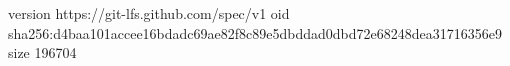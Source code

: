 version https://git-lfs.github.com/spec/v1
oid sha256:d4baa101accee16bdadc69ae82f8c89e5dbddad0dbd72e68248dea31716356e9
size 196704
